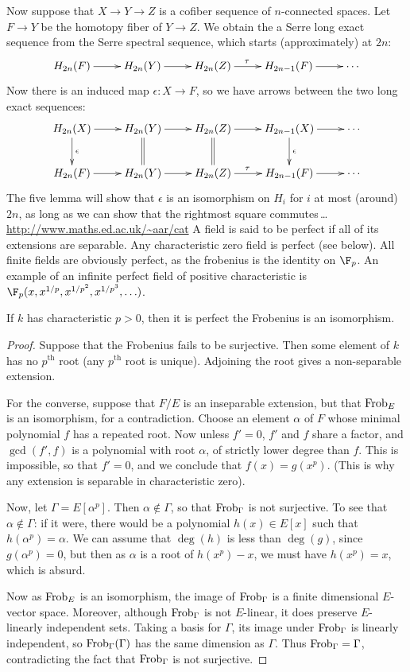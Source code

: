 \documentclass[11pt]{article}
\begin{document}
Now suppose that $X\to Y\to Z$ is a cofiber sequence of $n$-connected spaces.
Let $F\to Y$ be the homotopy fiber of $Y\to Z$. We obtain the a Serre long exact
sequence from the Serre spectral sequence, which starts (approximately) at $2n$:
\[\xymatrix{
H_{2n}(F)\ar[r]&H_{2n}(Y)\ar[r]&H_{2n}(Z)\ar[r]^{\tau\ \ }&
H_{2n-1}(F)\ar[r]&\cdots
}\]
Now there is an induced map $\epsilon:X\to F$, so we have arrows between the two
long exact sequences:
\[\xymatrix{
H_{2n}(X)\ar[r]\ar[d]^\epsilon&H_{2n}(Y)\ar[r]\ar@{=}[d]&
H_{2n}(Z)\ar[r]^{\ \ }\ar@{=}[d]&H_{2n-1}(X)\ar[r]\ar[d]^\epsilon&\cdots\\
H_{2n}(F)\ar[r]&H_{2n}(Y)\ar[r]&H_{2n}(Z)\ar[r]^{\tau\ \ }&
H_{2n-1}(F)\ar[r]&\cdots
}\]
The five lemma will show that $\epsilon$ is an isomorphism on $H_{i}$ for $i$ at
most (around) $2n$, as long as we can show that the rightmost square 
commutes\,\ldots
{}
\url{http://www.maths.ed.ac.uk/~aar/cat}
A field is said to be perfect if all of its extensions are separable. Any
characteristic zero field is perfect (see below). All finite fields are
obviously perfect, as the frobenius is the identity on $\F_p$. An example of an
infinite perfect field of positive characteristic is
$\F_p(x,x^{1/p},x^{1/p^2},x^{1/p^3},\ldots)$.

\begin{fact*}If $k$ has characteristic $p>0$, then it
is perfect \Iff the Frobenius is an isomorphism.\end{fact*}
\begin{proof}
Suppose that the Frobenius fails to be surjective. Then some element of $k$ has
no $p^\text{th}$ root (any $p^\text{th}$ root is unique). Adjoining the root
gives a non-separable extension.

For the converse, suppose that $F/E$ is an inseparable extension, but that
$\operatorname{Frob}_E$ is an isomorphism, for a contradiction. Choose an element $\alpha$ of
$F$ whose minimal polynomial $f$ has a repeated root. Now unless $f'=0$, $f'$
and $f$ share a factor, and $\gcd(f',f)$ is a polynomial with root $\alpha$, of
strictly lower degree than $f$. This is impossible, so that $f'=0$, and we
conclude that $f(x)=g(x^p)$. (This is why any extension is separable in
characteristic zero).

Now, let $\Gamma=E[\alpha^p]$. Then $\alpha\notin\Gamma$, so that $\operatorname{Frob}_\Gamma$
is not surjective. To see that $\alpha\notin\Gamma$: if it were, there would be
a polynomial $h(x)\in E[x]$ such that $h(\alpha^p)=\alpha$. We can assume that
$\deg(h)$ is less than $\deg(g)$, since $g(\alpha^p)=0$, but then as $\alpha$ is
a root of $h(x^p)-x$, we must have $h(x^p)=x$, which is absurd.

Now as $\operatorname{Frob}_E$ is an isomorphism, the image of $\operatorname{Frob}_\Gamma$ is a finite
dimensional $E$-vector space. Moreover, although $\operatorname{Frob}_\Gamma$ is not
$E$-linear, it does preserve $E$-linearly independent sets. Taking a basis for
$\Gamma$, its image under $\operatorname{Frob}_\Gamma$ is linearly independent, so
$\operatorname{Frob}_\Gamma(\Gamma)$ has the same dimension as $\Gamma$. Thus
$\operatorname{Frob}_\Gamma=\Gamma$, contradicting the fact that $\operatorname{Frob}_\Gamma$ is not
surjective.
\end{proof}
\end{document}
